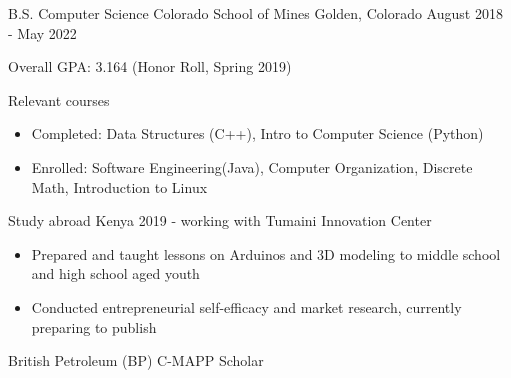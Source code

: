\vspace{-2.0mm}


\begin{cventries}

  \cventry
    {B.S. Computer Science}
    {Colorado School of Mines} %
    {Golden, Colorado} %
    {August 2018 - May 2022} %
    {
      \begin{cvitems} %
        \item {Overall GPA: 3.164 (Honor Roll, Spring 2019)}
        \item {Relevant courses}
        \begin {itemize}
               \item {Completed: Data Structures (C++), Intro to
    Computer Science (Python)}
        \item {Enrolled: Software Engineering(Java), Computer
    Organization, Discrete Math, Introduction to Linux}
       \end {itemize}
\item {Study abroad Kenya 2019 - working with Tumaini Innovation Center}
  \begin{itemize}
    \item {Prepared and taught lessons on Arduinos and 3D modeling to
    middle school and high school aged youth}
    \item {Conducted entrepreneurial self-efficacy and market research, currently preparing to publish}
\end{itemize}
\item {British Petroleum (BP) C-MAPP Scholar}
      \end{cvitems}
    }



\end{cventries}

